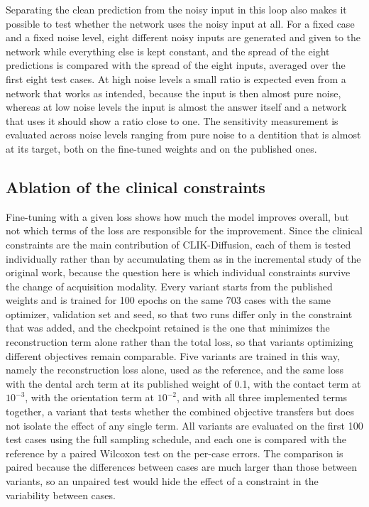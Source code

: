 \documentclass[10pt,a4paper]{article}
\begin{document}
Separating the clean prediction from the noisy input in this loop also makes it possible to test whether the network uses the noisy input at all. For a fixed case and a fixed noise level, eight different noisy inputs are generated and given to the network while everything else is kept constant, and the spread of the eight predictions is compared with the spread of the eight inputs, averaged over the first eight test cases. At high noise levels a small ratio is expected even from a network that works as intended, because the input is then almost pure noise, whereas at low noise levels the input is almost the answer itself and a network that uses it should show a ratio close to one. The sensitivity measurement is evaluated across noise levels ranging from pure noise to a dentition that is almost at its target, both on the fine-tuned weights and on the published ones.

\subsection{Ablation of the clinical constraints}

Fine-tuning with a given loss shows how much the model improves overall, but not which terms of the loss are responsible for the improvement. Since the clinical constraints are the main contribution of CLIK-Diffusion, each of them is tested individually rather than by accumulating them as in the incremental study of the original work, because the question here is which individual constraints survive the change of acquisition modality. Every variant starts from the published weights and is trained for 100 epochs on the same 703 cases with the same optimizer, validation set and seed, so that two runs differ only in the constraint that was added, and the checkpoint retained is the one that minimizes the reconstruction term alone rather than the total loss, so that variants optimizing different objectives remain comparable. Five variants are trained in this way, namely the reconstruction loss alone, used as the reference, and the same loss with the dental arch term at its published weight of 0.1, with the contact term at $10^{-3}$, with the orientation term at $10^{-2}$, and with all three implemented terms together, a variant that tests whether the combined objective transfers but does not isolate the effect of any single term. All variants are evaluated on the first 100 test cases using the full sampling schedule, and each one is compared with the reference by a paired Wilcoxon test on the per-case errors. The comparison is paired because the differences between cases are much larger than those between variants, so an unpaired test would hide the effect of a constraint in the variability between cases.
\end{document}
